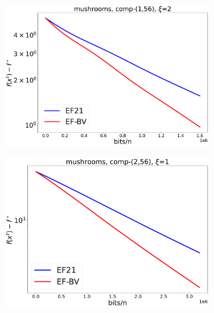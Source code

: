 \documentclass{article} %
\theoremstyle{plain}
\theoremstyle{definition}
\theoremstyle{remark}
\begin{document}
\begin{figure}[!htbp]
\begin{subfigure}[b]{0.32\textwidth}
         \centering
         \includegraphics[width=\textwidth]{img/mushrooms/CompK_56_1_mushrooms_8124workers_3000K_8124_mushrooms_56_1_1_2_logreg_diff_conv.pdf}
         \label{005}
      \end{subfigure}
      \hfill
      \begin{subfigure}[b]{0.32\textwidth}
         \centering
         \includegraphics[width=\textwidth]{img/mushrooms/CompK_56_2_mushrooms_8124workers_3000K_8124_mushrooms_56_2_1_1_logreg_diff_conv.pdf}
         \label{006}
      \end{subfigure}
      \hfill
      \begin{subfigure}[b]{0.32\textwidth}
         \centering

\end{subfigure}
\end{figure}
\end{document}
